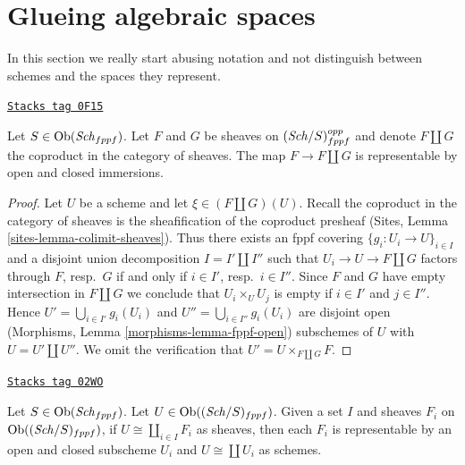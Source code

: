 \section{Glueing algebraic spaces}
\label{spaces-section-glueing-algebraic-spaces}
In this section we really start abusing notation and not
distinguish between schemes and the spaces they represent.

\begin{lemma}
\label{spaces-lemma-coproduct-sheaves-open-and-closed}
\href{https://stacks.math.columbia.edu/tag/0F15}{\texttt{Stacks tag 0F15}}

Let $S \in \operatorname{Ob}(\mathit{Sch}_{fppf})$. Let $F$ and $G$ be sheaves on
$(\mathit{Sch}/S)_{fppf}^{opp}$ and denote $F \amalg G$ the coproduct
in the category of sheaves. The map $F \to F \amalg G$ is representable by
open and closed immersions.
\end{lemma}

\begin{proof}
Let $U$ be a scheme and let $\xi \in (F \amalg G)(U)$. Recall the
coproduct in the category of sheaves is the sheafification of
the coproduct presheaf (Sites, Lemma \ref{sites-lemma-colimit-sheaves}).
Thus there exists an fppf covering $\{g_i : U_i \to U\}_{i \in I}$
and a disjoint union decomposition $I = I' \amalg I''$ such that
$U_i \to U \to F \amalg G$ factors through $F$, resp.\ $G$
if and only if $i \in I'$, resp.\ $i \in I''$. Since $F$ and
$G$ have empty intersection in $F \amalg G$ we conclude that
$U_i \times_U U_j$ is empty if $i \in I'$ and $j \in I''$.
Hence $U' = \bigcup_{i \in I'} g_i(U_i)$ and
$U'' = \bigcup_{i \in I''} g_i(U_i)$ are disjoint open
(Morphisms, Lemma \ref{morphisms-lemma-fppf-open}) subschemes of $U$
with $U = U' \amalg U''$.
We omit the verification that $U' = U \times_{F \amalg G} F$.
\end{proof}

\begin{lemma}
\label{spaces-lemma-representable-sheaf-coproduct-sheaves}
\href{https://stacks.math.columbia.edu/tag/02WO}{\texttt{Stacks tag 02WO}}

Let $S \in \operatorname{Ob}(\mathit{Sch}_{fppf})$.
Let $U \in \operatorname{Ob}((\mathit{Sch}/S)_{fppf})$.
Given a set $I$ and sheaves $F_i$ on $\operatorname{Ob}((\mathit{Sch}/S)_{fppf})$,
if $U \cong \coprod_{i\in I} F_i$
as sheaves, then each $F_i$ is representable by an open and closed
subscheme $U_i$ and $U \cong \coprod U_i$ as schemes.
\end{lemma}

